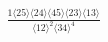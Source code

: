 \documentclass[varwidth, border=5pt]{standalone}
\begin{document}
\begin{my}
$\begin{gathered}
\scriptscriptstyle\frac{1⟨25⟩⟨24⟩⟨45⟩⟨23⟩⟨13⟩}{⟨12⟩^2⟨34⟩^4}
\end{gathered}$
\end{my}
\end{document}

